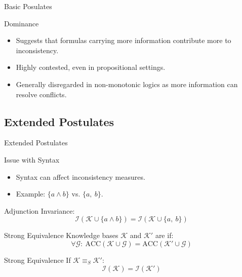 \begin{frame}{Basic Posulates}
    \begin{alertblock}{Dominance}
        \begin{itemize}
            \item Suggests that formulas carrying more information contribute more to inconsistency.
            \item Highly contested, even in propositional settings.
        \end{itemize}
    \end{alertblock}
    \begin{itemize}
        \item Generally disregarded in non-monotonic logics as more information can resolve conflicts.
    \end{itemize}
\end{frame}

\subsection{Extended Postulates}

\begin{frame}{Extended Postulates}
    \begin{alertblock}{Issue with Syntax}
        \begin{itemize}
            \item Syntax can affect inconsistency measures.
            \item Example: \(\{a \land b\}\) vs. \(\{a,\ b\}\).
        \end{itemize}
    \end{alertblock}
    Adjunction Invariance:
    \[
        \mathcal{I}(\mathcal{K} \cup \{a \land b\}) = \mathcal{I}(\mathcal{K} \cup \{a,\ b\})
    \]
\end{frame}

\begin{frame}{Strong Equivalence}
    Knowledge bases \(\mathcal{K}\) and \(\mathcal{K}'\) are  if:
    \[
        \forall \mathcal{G}:\ \text{ACC}(\mathcal{K} \cup \mathcal{G}) = \text{ACC}(\mathcal{K}' \cup \mathcal{G})
    \]
    \begin{block}{Strong Equivalence}
        If \(\mathcal{K} \equiv_S \mathcal{K}'\):
        \[
            \mathcal{I}(\mathcal{K}) = \mathcal{I}(\mathcal{K}')
        \]
    \end{block}
\end{frame}


